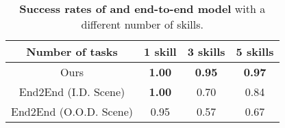 

\begin{table}
    \begin{center}
        \caption{\textbf{Success rates of \our and end-to-end model} with a different number of skills.
        }
        \label{tab:framework}
        \begin{tabular}{c|ccc}
        \toprule
        \textbf{Number of tasks} & $\mathbf{1}$ \textbf{skill} & $\mathbf{3}$ \textbf{skills} & $\mathbf{5}$ \textbf{skills} \\
            \midrule
Ours & \textbf{1.00} & \textbf{0.95} & \textbf{0.97} \\
End2End (I.D. Scene) & \textbf{1.00} & 0.70 & 0.84 \\
End2End (O.O.D. Scene) & 0.95 & 0.57 & 0.67 \\
            \bottomrule
        \end{tabular}
        \vspace{-10pt}
    \end{center}
\end{table}